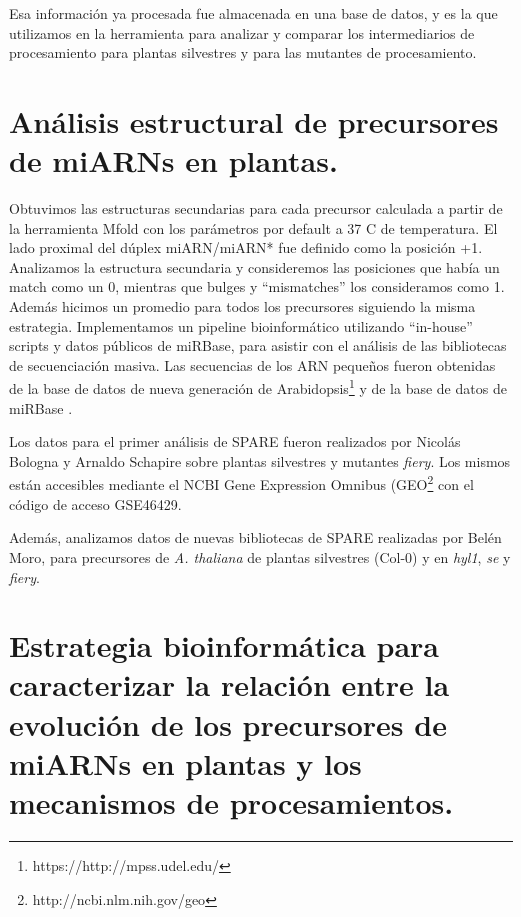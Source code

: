 Esa información ya procesada fue almacenada en una base de datos, y es la que utilizamos en la herramienta para analizar y comparar los intermediarios de procesamiento para plantas silvestres y para las mutantes de procesamiento.

\section{Análisis estructural de precursores de miARNs en plantas.}\label{sec:estruc_sec}

Obtuvimos las estructuras secundarias para cada precursor calculada a partir de la herramienta Mfold \citep{pmid12824337} con los parámetros por default a 37 \degree C de temperatura.
El lado proximal del dúplex miARN/miARN* fue definido como la posición +1.
Analizamos la estructura secundaria y consideremos las posiciones que había un match como un 0, mientras que bulges y ``mismatches'' los consideramos como 1.
Además hicimos un promedio para todos los precursores siguiendo la misma estrategia.
Implementamos un pipeline bioinformático utilizando ``in-house'' scripts y datos públicos de miRBase, para asistir con el análisis de las bibliotecas de secuenciación masiva.
Las secuencias de los ARN pequeños fueron obtenidas de la base de datos de nueva generación de Arabidopsis\footnote{https://http://mpss.udel.edu/} \citep{pmid25120269} y  de la base de datos de miRBase \citep{Kozomara2014}.

Los datos para el primer análisis de SPARE fueron realizados por Nicolás Bologna y Arnaldo Schapire sobre plantas silvestres y mutantes \textit{fiery}.
Los mismos están accesibles mediante el NCBI Gene Expression Omnibus (GEO\footnote{http://ncbi.nlm.nih.gov/geo} con el código de acceso GSE46429.

Además, analizamos datos de nuevas bibliotecas de SPARE realizadas por Belén Moro, para precursores de \textit{A. thaliana} de plantas silvestres (Col-0) y en \textit{hyl1}, \textit{se} y \textit{fiery}.

\section{Estrategia bioinformática para caracterizar la relación entre la evolución de los precursores de miARNs en plantas y los mecanismos de procesamientos.} \label{sec:ref_evolution}

